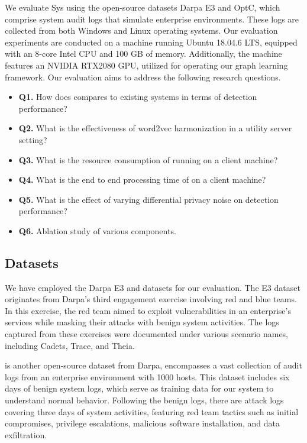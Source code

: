We evaluate Sys using the open-source datasets Darpa E3 and OptC, which comprise system audit logs that simulate enterprise environments. These logs are collected from both Windows and Linux operating systems. Our evaluation experiments are conducted on a machine running Ubuntu 18.04.6 LTS, equipped with an 8-core Intel CPU and 100 GB of memory. Additionally, the machine features an NVIDIA RTX2080 GPU, utilized for operating our graph learning framework. Our evaluation aims to address the following research questions.

\begin{itemize}[leftmargin=*]
\item \textbf{Q1.} How does \Sys compares to existing systems in terms of detection performance?
\item \textbf{Q2.} What is the effectiveness of word2vec harmonization in a utility server setting?
\item \textbf{Q3.} What is the resource consumption of \Sys running on a client machine?
\item \textbf{Q4.} What is the end to end processing time of \Sys on a client machine?
\item \textbf{Q5.} What is the effect of varying differential privacy noise on detection performance?
\item \textbf{Q6.} Ablation study of various \Sys components.
\end{itemize}

\subsection*{Datasets}
We have employed the Darpa E3 and \optc datasets for our evaluation. The E3 dataset originates from Darpa's third engagement exercise involving red and blue teams. In this exercise, the red team aimed to exploit vulnerabilities in an enterprise's services while masking their attacks with benign system activities. The logs captured from these exercises were documented under various scenario names, including Cadets, Trace, and Theia.

\optc is another open-source dataset from Darpa, encompasses a vast collection of audit logs from an enterprise environment with 1000 hosts. This dataset includes six days of benign system logs, which serve as training data for our system to understand normal behavior. Following the benign logs, there are attack logs covering three days of system activities, featuring red team tactics such as initial compromises, privilege escalations, malicious software installation, and data exfiltration.

